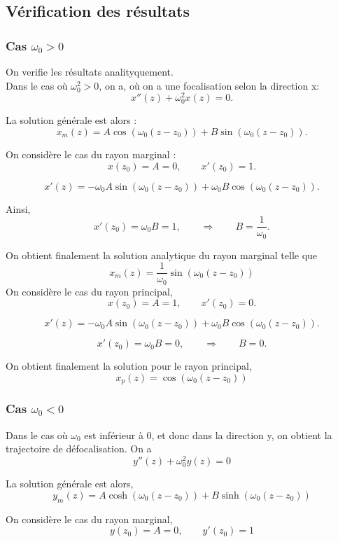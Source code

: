 \documentclass{article}
\begin{document}
\subsection{Vérification des résultats}
\subsubsection{Cas $\omega_0 > 0$}

On verifie les résultats analityquement.\\
Dans le cas où $\omega_0^2 > 0$, on a, où on a une focalisation selon la direction x:
\[
x''(z) + \omega_0^2 x(z) = 0 .
\]

La solution générale est alors :
\[
x_m(z) = A \cos\!\left(\omega_0 (z - z_0)\right)
+ B \sin\!\left(\omega_0 (z - z_0)\right).
\]

On considère le cas du rayon marginal :
\[
x(z_0) =  A =0, \qquad x'(z_0) = 1 .
\]

\[
x'(z) =
- \omega_0 A \sin\!\left(\omega_0 (z - z_0)\right)
+ \omega_0 B \cos\!\left(\omega_0 (z - z_0)\right).
\]

Ainsi,
\[
x'(z_0) = \omega_0 B = 1 ,
\qquad \Rightarrow \qquad
B = \frac{1}{\omega_0}.
\]

On obtient finalement la solution analytique du rayon marginal telle que
\[
\boxed{
x_m(z) = \frac{1}{\omega_0}
\sin\!\left(\omega_0 (z - z_0)\right)
}
\] 
On considère  le cas du rayon principal,
\[
x(z_0) = A =1, \qquad x'(z_0) = 0 .
\]

\[
x'(z) =
- \omega_0 A \sin\!\left(\omega_0 (z - z_0)\right)
+ \omega_0 B \cos\!\left(\omega_0 (z - z_0)\right).
\]

\[
x'(z_0) = \omega_0 B = 0 , \qquad \Rightarrow \qquad B = 0 .
\]

On obtient finalement la solution pour le rayon principal,
\[
\boxed{
x_p(z) = \cos\!\left(\omega_0 (z - z_0)\right)
}
\]


\subsubsection{Cas $\omega_0 <0$}
Dans le cas où $\omega_0$ est inférieur à 0, et donc dans la direction y, on obtient la trajectoire de défocalisation. On a 
\[
y''(z) + \omega_0^2 y(z) = 0 
\]

La solution générale est alors,
\[
y_m(z) = A \cosh\!\left(\omega_0 (z - z_0)\right)
+ B \sinh\!\left(\omega_0 (z - z_0)\right)
\]

On considère le cas du rayon marginal,
\[
y(z_0) = A = 0, \qquad y'(z_0) = 1 
\]
\end{document}
